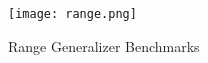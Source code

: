 \begin{figure}[H]
    \centering
    \texttt{[image: range.png]}
    \caption{Range Generalizer Benchmarks}\label{fig:range_bm}
\end{figure}